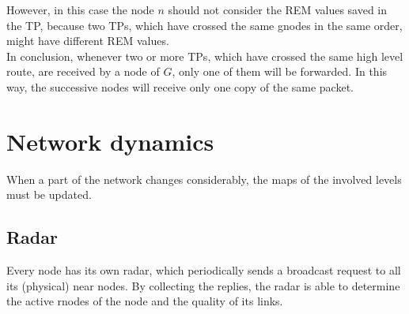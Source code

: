 \documentclass[a4paper]{article}
\begin{document}
However, in this case the node $n$ should not consider the REM
values saved in the TP, because two TPs, which have crossed the same
gnodes in the same order, might have different REM values.
\\

In conclusion, whenever two or more TPs, which have crossed the same high level
route, are received by a node of $G$, only one of them will be forwarded. In
this way, the successive nodes will receive only one copy of the same packet.

\section{Network dynamics}
When a part of the network changes considerably, the maps of the involved
levels must be updated.

\subsection{Radar}
Every node has its own radar, which periodically sends a broadcast request to
all its (physical) near nodes. By collecting the replies, the radar is able to
determine the active rnodes of the node and the quality of its links.
\end{document}
